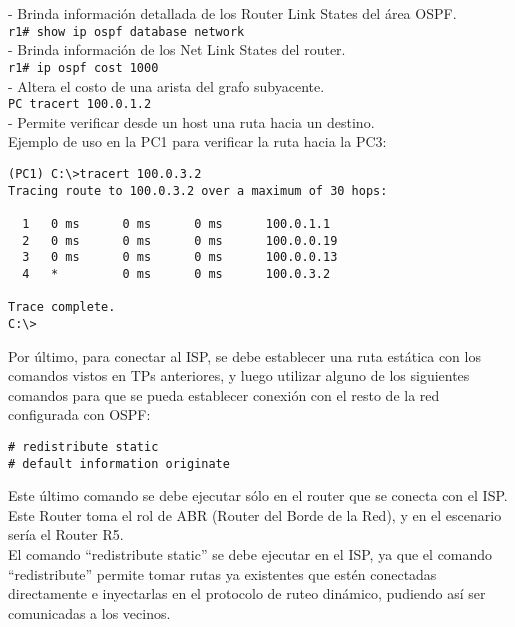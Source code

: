 \documentclass{article}
\begin{document}
- Brinda informaci\'on detallada de los Router Link States del \'area OSPF. \\

\texttt{r1\# show ip ospf database network} \\

- Brinda informaci\'on de los Net Link States del router. \\

\texttt{r1\# ip ospf cost 1000} \\

- Altera el costo de una arista del grafo subyacente. \\

\texttt{PC\> tracert 100.0.1.2} \\

- Permite verificar desde un host una ruta hacia un destino. \\ 

Ejemplo de uso en la PC1 para verificar la ruta hacia la PC3:

\begin{verbatim}
(PC1) C:\>tracert 100.0.3.2
Tracing route to 100.0.3.2 over a maximum of 30 hops: 

  1   0 ms      0 ms      0 ms      100.0.1.1
  2   0 ms      0 ms      0 ms      100.0.0.19
  3   0 ms      0 ms      0 ms      100.0.0.13
  4   *         0 ms      0 ms      100.0.3.2

Trace complete.
C:\>

\end{verbatim}

Por \'ultimo, para conectar al ISP, se debe establecer una ruta est\'atica con los comandos vistos en TPs anteriores, y luego utilizar alguno de los siguientes comandos para que se pueda establecer conexi\'on con el resto de la red configurada con OSPF:

\begin{verbatim}
# redistribute static
# default information originate

\end{verbatim}

Este \'ultimo comando se debe ejecutar s\'olo en el router que se conecta con el ISP. Este Router toma el rol de ABR (Router del Borde de la Red), y en el escenario ser\'ia el Router R5. \\ 

El comando ``redistribute static'' se debe ejecutar en el ISP, ya que el comando ``redistribute'' permite tomar rutas ya existentes que est\'en conectadas directamente e inyectarlas en el protocolo de ruteo din\'amico, pudiendo as\'i ser comunicadas a los vecinos. \\
\end{document}

